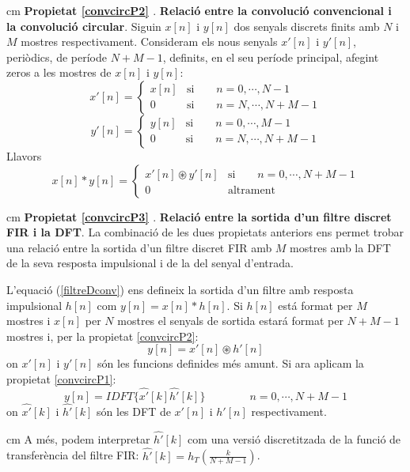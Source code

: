 \documentclass{article}
\begin{document}
 cm
\noindent
{\bf Propietat \ref{convcircP2} \label{convcircP2}}. {\bf Relaci\'o entre la convoluci\'o 
convencional i la convoluci\'o circular}.
Siguin $x[n]$ i $y[n]$ dos senyals discrets finits amb $N$ i $M$ mostres respectivament.
Consideram els nous senyals $x'[n]$ i $y'[n]$, peri\`odics, de per\'iode $N+M-1$, definits,
en el seu per\'iode principal, afegint zeros a les mostres de $x[n]$ i $y[n]$:
\[
x'[n]=\begin{cases} x[n] & \mathrm{si} \qquad n=0,\cdots,N-1\\
0 & \mathrm{si} \qquad n=N, \cdots, N+M-1 \end{cases}
\]
\[
y'[n]=\begin{cases} y[n] & \mathrm{si} \qquad n=0,\cdots,M-1\\
0 & \mathrm{si} \qquad n=N, \cdots, N+M-1 \end{cases}
\]
\noindent
Llavors 
\[
x[n]*y[n]=\begin{cases} x'[n]\circledast y'[n] & \mathrm{si} \qquad n=0,\cdots,N+M-1\\
0 & \mathrm{altrament} \end{cases}
\]

 cm
\noindent
{\bf Propietat \ref{convcircP3} \label{convcircP3}}. 
{\bf Relaci\'o entre la sortida d'un filtre discret FIR i la DFT}.
La combinaci\'o de les dues propietats anteriors ens permet trobar una relaci\'o entre
la sortida d'un filtre discret FIR amb $M$ mostres amb la DFT de la seva resposta
impulsional i de la del senyal d'entrada.

L'equaci\'o (\ref{filtreDconv}) ens defineix la sortida d'un filtre amb resposta impulsional
$h[n]$ com $y[n]=x[n]*h[n]$. Si $h[n]$ est\'a format per $M$ mostres i $x[n]$ per $N$ mostres
el senyals de sortida estar\'a format per $N+M-1$ mostres i, per la propietat \ref{convcircP2}:
\[
y[n]=x'[n]\circledast h'[n]
\]
\noindent 
on $x'[n]$ i $y'[n]$ s\'on les funcions definides m\'es amunt.
Si ara aplicam la propietat \ref{convcircP1}:
\begin{equation}
y[n]=IDFT \{ \widehat{x'}[k] \widehat{h'}[k] \} \qquad \qquad n=0, \cdots, N+M-1
\end{equation}
\noindent 
on $\widehat{x'}[k]$ i $\widehat{h'}[k]$ s\'on les DFT de $x'[n]$ i $h'[n]$ respectivament.

 cm
A m\'es, podem interpretar $\widehat{h'}[k]$ com una versi\'o discretitzada de la funci\'o de 
transfer\`encia del filtre FIR: $\widehat{h'}[k]=h_T(\frac{k}{N+M-1})$.
\end{document}
